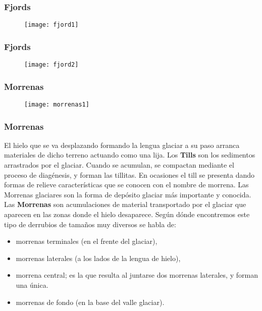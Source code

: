 \documentclass{beamer}
\begin{document}
\begin{frame}
\frametitle{Fjords}
\begin{figure}
\begin{center}
\texttt{[image: fjord1]}
\end{center}
\end{figure}
\end{frame}
\begin{frame}
\frametitle{Fjords}
\begin{figure}
\begin{center}
\texttt{[image: fjord2]}
\end{center}
\end{figure}
\end{frame}
\begin{frame}
\frametitle{Morrenas}
\begin{figure}
\begin{center}
\texttt{[image: morrenas1]}
\end{center}
\end{figure}
\end{frame}
\begin{frame}
\frametitle{Morrenas}
\justifying
\small{
El hielo que se va desplazando formando la lengua glaciar a su paso arranca materiales de dicho terreno actuando como una lija.\vfill
Los \textbf{Tills} son los sedimentos arrastrados por el glaciar. Cuando se acumulan, se compactan mediante el proceso de diagénesis, y forman las tillitas.\vfill 
En ocasiones el till se presenta dando formas de relieve características que se conocen con el nombre de morrena. Las Morrenas glaciares son la forma de depósito glaciar más importante y conocida.\vfill
Las \textbf{Morrenas} son acumulaciones de material transportado por el glaciar que aparecen en las zonas donde el hielo desaparece. Según dónde encontremos este tipo de derrubios de tamaños muy diversos se habla de:
\begin{itemize}
\item morrenas terminales (en el frente del glaciar), 
\item morrenas laterales (a los lados de la lengua de hielo),
\item morrena central; es la que resulta al juntarse dos morrenas laterales, y forman una única.
\item morrenas de fondo (en la base del valle glaciar). 
\end{itemize}
}
\end{frame}
\end{document}
